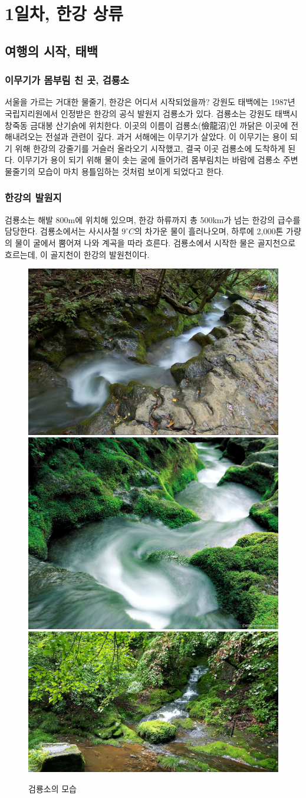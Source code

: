 
\chapter{1일차, 한강 상류}
\section{여행의 시작, 태백}
\subsection{이무기가 몸부림 친 곳, 검룡소}
서울을 가르는 거대한 물줄기, 한강은 어디서 시작되었을까? 
강원도 태백에는 1987년 국립지리원에서 인정받은 한강의 공식 발원지 검룡소가 있다. 
검룡소는 강원도 태백시 창죽동 금대봉 산기슭에 위치한다. 
이곳의 이름이 검룡소(儉龍沼)인 까닭은 이곳에 전해내려오는 전설과 관련이 깊다. 과거 서해에는 이무기가 살았다. 
이 이무기는 용이 되기 위해 한강의 강줄기를 거슬러 올라오기 시작했고, 결국 이곳 검룡소에 도착하게 된다. 
이무기가 용이 되기 위해 물이 솟는 굴에 들어가려 몸부림치는 바람에 검룡소 주변 물줄기의 모습이 마치 용틀임하는 것처럼 보이게 되었다고 한다. 

\subsection{한강의 발원지}
검룡소는 해발 800m에 위치해 있으며, 한강 하류까지 총 500km가 넘는 한강의 급수를 담당한다. 
검룡소에서는 사시사철 $9^\circ C$의 차가운 물이 흘러나오며, 
하루에 2,000톤 가량의 물이 굴에서 뿜어져 나와 계곡을 따라 흐른다. 
검룡소에서 시작한 물은 골지천으로 흐르는데, 이 골지천이 한강의 발원천이다. 

\begin{figure}
    \centering
    \includegraphics[width=.32\textwidth]{s_img/검룡소_사진.jpg}
    \includegraphics[width=.32\textwidth]{s_img/검룡소_사진2.jpeg}
    \includegraphics[width=.32\textwidth]{s_img/태백검룡소_사진_low.jpg}
    \caption{검룡소의 모습}
    \label{fig:my_label_s1}
 \end{figure}

